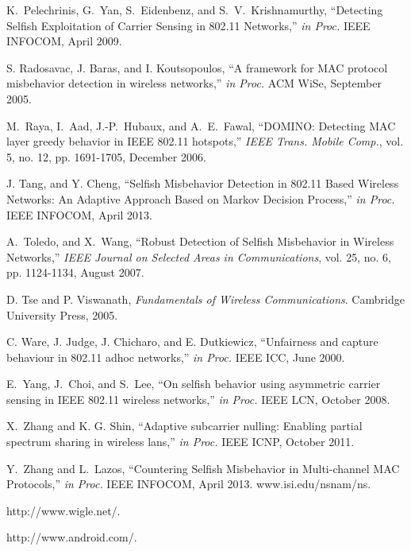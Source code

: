 \documentclass[10pt,journal,cspaper,compsoc]{IEEEtran}
\begin{document}
\begin{thebibliography}{1}

K.~Pelechrinis, G.~Yan, S.~Eidenbenz, and S.~V.~Krishnamurthy,
``Detecting Selfish Exploitation of Carrier Sensing in 802.11 Networks,''
{\em in Proc.} IEEE INFOCOM, April 2009.


S. Radosavac, J. Baras, and I. Koutsopoulos,
``A framework for MAC protocol misbehavior detection in wireless networks,''
{\em in Proc.} ACM WiSe, September 2005.

M.~Raya, I.~Aad, J.-P.~Hubaux, and A.~E.~Fawal,
``DOMINO: Detecting MAC layer greedy behavior in IEEE 802.11 hotspots,''
{\em IEEE Trans. Mobile Comp.}, vol. 5, no. 12, pp. 1691-1705, December 2006.



J. Tang, and Y. Cheng,
``Selfish Misbehavior Detection in 802.11 Based Wireless Networks:
An Adaptive Approach Based on Markov Decision Process,''
{\em in Proc.} IEEE INFOCOM, April 2013.

A.~Toledo, and X.~Wang,
``Robust Detection of Selfish Misbehavior in Wireless Networks,''
{\em IEEE Journal on Selected Areas in Communications}, vol. 25, no. 6,
pp. 1124-1134, August 2007.

D. Tse and P. Viswanath,
\emph{Fundamentals of Wireless Communications}.
Cambridge University Press, 2005.



C. Ware, J. Judge, J. Chicharo, and E. Dutkiewicz,
``Unfairness and capture behaviour in 802.11 adhoc networks,''
{\em in Proc.} IEEE ICC, June 2000.

E.~Yang, J.~Choi, and S.~Lee,
``On selfish behavior using asymmetric carrier sensing in IEEE 802.11 wireless networks,''
{\em in Proc.} IEEE LCN, October 2008.

X.~Zhang and K. G. Shin,
``Adaptive subcarrier nulling: Enabling partial spectrum sharing in wireless lans,''
{\em in Proc. } IEEE ICNP, October 2011.

Y.~Zhang and L.~Lazos,
``Countering Selﬁsh Misbehavior in Multi-channel
MAC Protocols,''
{\em in Proc.} IEEE INFOCOM, April 2013.
www.isi.edu/nsnam/ns.

http://www.wigle.net/.

http://www.android.com/.



\end{thebibliography}
\end{document}
